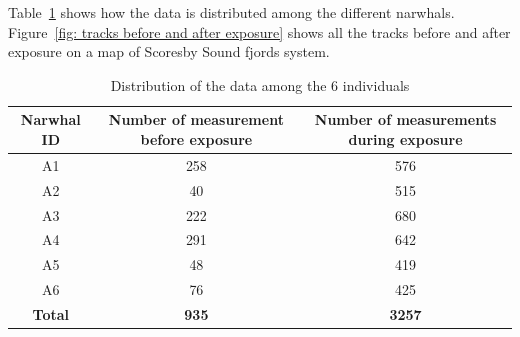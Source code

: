 \documentclass[11pt]{article}
\newcommand {\1}{\mathbb{1}}
\begin{document}
 Table~\ref{table: data distribution}  shows how the data is distributed among the different narwhals. Figure~\ref{fig: tracks before and after exposure} shows all the tracks before and after exposure on a map of Scoresby Sound fjords system.

\begin{table}[H]
	\centering
	\begin{tabular}{|c|c|c|}
		\hline
		Narwhal ID & Number of measurement before exposure & Number of measurements during exposure \\
		\hline
		A1 & 258 & 576\\
		\hline
		A2  & 40 & 515 \\
		\hline
		A3 & 222 & 680 \\
		\hline
		A4 & 291 & 642  \\
		\hline
		A5 & 48 & 419\\
		\hline
		A6 & 76 & 425 \\
		\hline
		\textbf{Total} & \textbf{935} & \textbf{3257} \\
		\hline
	\end{tabular}
	\caption{Distribution of the data among the 6 individuals}
	\label{table: data distribution}
\end{table}
\end{document}
